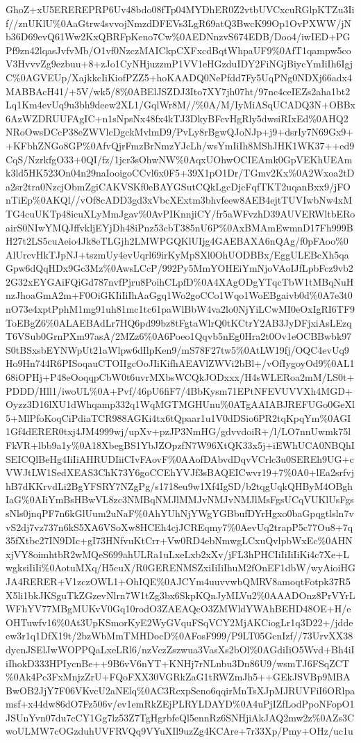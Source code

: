 \documentclass[]{article}
\begin{document}
GhoZ+xU5EREREPRP6Uv48bdo08fTp04MYDhER0Z2vtbUVCxcuRGlpKTZu3Iif//znUKlU\%0AaGtrw4svvojNmzdDFEVs3LgR69atQ3BwcK99Op1OvPXWW/jNb36D69evQ61Ww2KxQBRFpKeno7Cw\%0AEDNnzvS674EDB/Doo4/iwIED+PGPf9zn42lqasJvfvMb/O1vf0NzczMAICkpCXFxcdBqtWhpaUF9\%0AfT1qampw5coV3HvvvZg9ezbuu+8+zJo1CyNHjuzzmP1VV1eHGzduIDY2FiNGjBiycYmIiIh6IgjC\%0AGVEUp/XajkkcIiKiofPZZ5+hoKAADQ0NePfdd7Fy5UqPNg0NDXj66adx4MABBAcH41/+5V/wk5/8\%0ABElJSZDJ3Ito7XY7jh07ht/97nc4ceIEZs2aha1bt2Lq1Km4evUq9u3bh9deew2XL1/GqlWr8M//\%0A/M/IyMiASqUCADQ3N+OBBx6AzWZDRUUFAgIC+n1sNpsNx48fx4kTJ3DkyBFcvHgRly5dwsiRIxEd\%0AHQ2NRoOwsDCcP38eZWVlcDgckMvlmD9/PvLy8rBgwQJoNJp+j9+dsrIy7N69Gx9++KFbhZNGo8GP\%0AfvQjrFmzBrNmzYJcLh/wsYmIiIh8MShJHK1WK37++ed9CqS/NzrkfgO33+0QI/fz/1jcr3sOhwNW\%0AqxUOhwOCIEAmk0GpVEKhUEAmk3ld5HK523On04n29naIooigoCCvl6x0F5+39X1pO1Dr/TGmv2Kx\%0A2Wxoa2tDa2sr2tra0NzcjObmZgiCAKVSKf0eBAYGSutCQkLgcDjcFqfTKT2uqanBxx9/jFOnTiEp\%0AKQl//vOf8cADD3gd3xVbcXExtm3bhvfeew8AEB4ejtTUVIwbNw4xMTG4cuUKTp48icuXLyMmJgav\%0AvPIKnnjiCY/fr5aWFvzhD39AUVERWltbERoairS0NIwYMQJffvkljEYjDh48iPnz53cbT385nU6P\%0AxBMAmEwmnD17Fh999BH27t2LS5cuAeio4Jk8eTLGjh2LMWPGQKlUIjg4GAEBAXA6nQAg/f0pFAoo\%0AlUrcvHkTJpNJ+tszmUy4evUqrl69irKyMpSXl0OhUODBBx/EggULEBcXh5qaGpw6dQqHDx9Gc3Mz\%0AwsLCcP/992Py5MmYOHEiYmNjoVAoIJfLpbFcz9vb22G32xEYGAiFQiGd787nvfPjru8PoihCLpfD\%0A4XAgODgYTqcTbW1tMBqNuHnzJhoaGmA2m+F0OiGKIiIiIhAaGgq1Wo2goCCo1Wqo1WoEBgaivb0d\%0A7e3t0nO73e4xptPphM1mg91uh81mc1tc61paWlBbW4va2lo0NjYiLCwMI0eOxIgRI6TF9ToEBgZ6\%0ALAEBAdLr7HQ6pd99bz8tFgtaWlrQ0tKCtrY2AB3JyDFjxiAsLEzqT6VSub0GrnPXm97asA/2MZz6\%0A6Poeo1Qqvb5nEg0Hra2t0Ov1eOCBBwbk97S0tBSxsbEYNWpUt21aWlpw6dIlpKen9/mS78F27tw5\%0AtLW19fj/OQC4evUq9Ho9Hn744R6PISoqauCTOIIgcOoJIiKifhAEAVlZWVi2bBl+/vOfIygoyOd9\%0AL168iOPHj+P48eOoqqpCbW0t6uvrMXbsWCQkJODxxx/H4sWLERoa2mM/LS0t+PDDD/Hll1/iwoUL\%0A+Pvf/46pU6fiF7/4BbKysm71EPtNFEVUVVXh4MGD+Oyzz3D16lXU1dWhqamp332q1WqMGTMGHUnu\%0ATgAAIABJREFUGo0GeXl5+MlPfoKoqCiPdiaTCR988AGKi4tx6tQpaar1u1V0dDSio6PR2tqKpqYm\%0AGI1Gf4dERER0txj4JM4999wj/upXv+pzJP3NmHG/gdvvdoiR+/l/LO7nnUwmk75lFkVR+lbb9a1y\%0A18XbegBS1YbJZOpzfN7W96XtQK33x5j+iEWhUCA0NBQhISEICQlBeHg4IiIiAHRUDIiiCIvFAovF\%0AAofDAbvdDqvVCrlc3u0SEREh9UG+cVWJtLW1SedXEAS3ChK73Y6goCCEhYVJf3sBAQEICwvr19+7\%0A0+lEa2srfvjhB7dKKrvdLi2BgYFSRY7NZgPg/s1718eu9w1Xf4IgSD/b2tqgUqkQHByM4OBghIaG\%0AIiYmBsHBwVL8zc3NMBqNMJlMMJvNMJvNMJlMsFgsUCqVUKlUsFgssNls0jnqPF7n6kGlUum2uNaF\%0AhYUhNjYWgYGBbufDYrHgxo0baGpqgtlsln7vvS2dj7vz737n6kS5XA6VSoXw8HCEh4cjJCREqmy7\%0AevUq2trapP5c77Ou8+7q35fXtbc27IN9DIc+gI73HNfvuKtCrr+Vw0RD4ebNmwgLCxuQvlpbWxEc\%0AHNxjVY8oimhtbR2wMQeS699ahULRa1uLxeLxb2xXv/jFL3hPHCIiIiIiIiKi4c7Xe+LwgksiIiIi\%0AotuMXq/H5cuX/R0GERENMSZxiIiIiIhuM2fOnEF1dbW/wyAioiHGJA4RERER+V1zczOWL1+OhIQE\%0AJCYm4uuvvwbQMRV8amoqtFotpk37R5X5li1bkJKSguTkZGzevNlrn7W1tZg3bx6SkpKQnJyMLVu2\%0AAADOnz8PrVYrLWFhYV77MBgMUKvV0Gq10rodO3ZAEAQcO3ZMWldYWAhBEHD48OE+H/eOHTuwfv16\%0At3UpKSmorKyE2WyGVquFSqVCY2MjAKCiogLr1q3D22+/jddeew3r1q1DfX19t/2bzWbMmTMHDocD\%0AFosF999/P9LT05GcnIzf//73UrvXX38dycnJSElJwWOPPQaLxeLRl6/nzVczZszwua3VasXs2bOl\%0AGdiIiO5Wvd+Bh4iIiIhokD333HPIycnBe++9B6vV6nYT+KNHj7rNLnbu3Dn86U9/wsmTJ6FSqZCT\%0Ak4Pc3FxMnjzZrU+FQoFXX30VGRkZaG1tRWZmJh5++GEkJSVBp9MBABwOB2JjY7F06VKvcU2aNElq\%0AC3RcxpSeno6qqirMnTsXJpMJRUVFiI6ORlpamsf+x44dw86dO7Fz506v/ev1emRkZEjPLRYLDAYD\%0A4uPjIZfLodPpoNFopO1JSUnYvn07du7cCY1Gg7lz53Z7TgHgrbfeQl5ennRz6SNHjiAkJAQ2mw2z\%0AZs3CwoULMW7cOGzduhUVFRVQq9VYuXIl9uzZg4KCAre+7r33Xp/Pmy+OHz/uc1u
\end{document}
